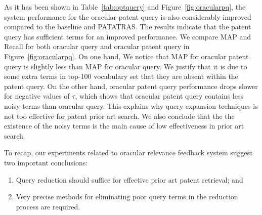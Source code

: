 As it has been shown in Table~\ref{tab:optquery} and Figure~\ref{fig:oracularpq}, the system performance for the oracular patent query is also considerably improved compared to the baseline and PATATRAS.
The results indicate that the patent query has sufficient terms for an improved performance. 
We compare MAP and Recall for both oracular query and oracular patent query in Figure~\ref{fig:oracularpq}. 
On one hand, We notice that MAP for oracular patent query is slightly less than MAP for oracular query. We justify that it is due to some extra terms in top-100 vocabulary set that they are absent within the patent query. On the other hand, oracular patent query performance drops slower for negative values of $\tau$, which shows that oracular patent query contains less noisy terms than oracular query. 
This explains why query expansion techniques is not too effective for patent prior art search. We also conclude that the the existence of the noisy terms is the main cause of low effectiveness in prior art search.  

To recap, our experiments related to oracular relevance feedback system
suggest two important conclusions: 
\begin{enumerate}
\item Query reduction should suffice for effective prior art patent retrieval; and 
\item Very precise methods for eliminating poor query terms in the reduction process are required.
\end{enumerate}

%

